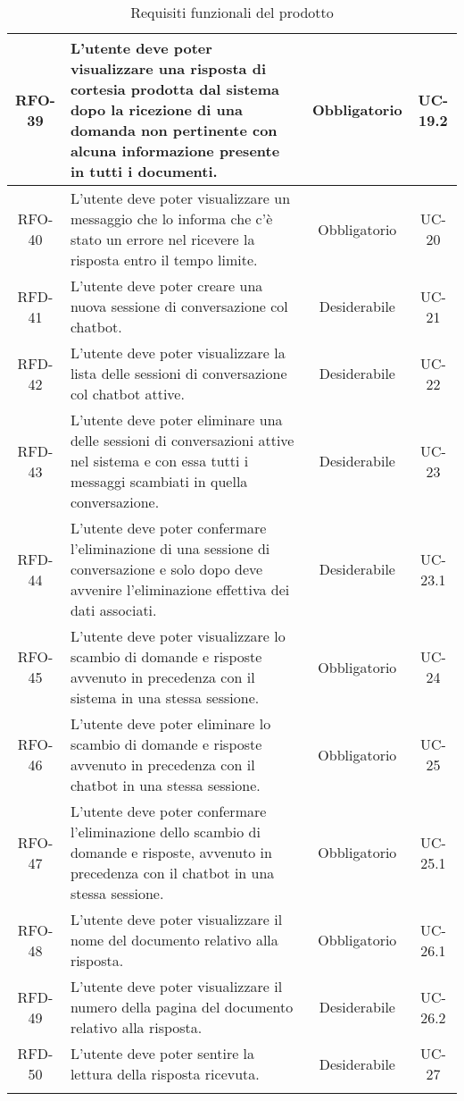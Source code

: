 \begin{xltabular}{\textwidth}{| c | X | c | c |}
    \hline
    RFO-39 & L’utente deve poter visualizzare una risposta di cortesia prodotta dal sistema dopo la ricezione di una domanda non pertinente con alcuna informazione presente in tutti i documenti. & Obbligatorio & UC-19.2 \\
    \hline
    RFO-40 & L'utente deve poter visualizzare un messaggio che lo informa che c'è stato un errore nel ricevere la risposta entro il tempo limite. & Obbligatorio & UC-20 \\
    \hline
    RFD-41 & L’utente deve poter creare una nuova sessione di conversazione col chatbot. & Desiderabile & UC-21 \\
    \hline
    RFD-42 & L’utente deve poter visualizzare la lista delle sessioni di conversazione col chatbot attive. & Desiderabile & UC-22 \\
    \hline
    RFD-43 & L’utente deve poter eliminare una delle sessioni di conversazioni attive nel sistema e con essa tutti i messaggi scambiati in quella conversazione. & Desiderabile & UC-23 \\
    \hline
    RFD-44 & L’utente deve poter confermare l’eliminazione di una sessione di conversazione e solo dopo deve avvenire l'eliminazione effettiva dei dati associati. & Desiderabile & UC-23.1 \\
    \hline
    RFO-45 & L’utente deve poter visualizzare lo scambio di domande e risposte avvenuto in precedenza con il sistema in una stessa sessione. & Obbligatorio & UC-24 \\
    \hline
    RFO-46 & L’utente deve poter eliminare lo scambio di domande e risposte avvenuto in precedenza con il chatbot in una stessa sessione. & Obbligatorio & UC-25 \\
    \hline
    RFO-47 & L’utente deve poter confermare l'eliminazione dello scambio di domande e risposte, avvenuto in precedenza con il chatbot in una stessa sessione. & Obbligatorio & UC-25.1 \\
    \hline
    RFO-48 & L’utente deve poter visualizzare il nome del documento relativo alla risposta. & Obbligatorio & UC-26.1 \\
    \hline
    RFD-49 & L'utente deve poter visualizzare il numero della pagina del documento relativo alla risposta. & Desiderabile & UC-26.2 \\
    \hline
    RFD-50 & L’utente deve poter sentire la lettura della risposta ricevuta. & Desiderabile & UC-27 \\
    \hline
     \caption{Requisiti funzionali del prodotto}
    \label{tab:reqfun}
\end{xltabular}
\endgroup

